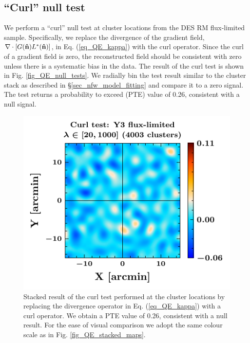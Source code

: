 \subsection{``Curl'' null test}\label{sec_null_tests}

We perform a ``curl'' null test \citep{hu07} at \howmanyclustersinfullsample{} cluster locations from the DES RM \whichyear{} flux-limited sample.
Specifically, we replace the divergence of the gradient field, $\nabla \cdot [G(\bm{\hat{\mbox{n}}}) L^{*}(\bm{\hat{\mbox{n}}})]$, in Eq. (\ref{eq_QE_kappa}) with the curl operator. 
Since the curl of a gradient field is zero, the reconstructed field should be consistent with zero unless there is a systematic bias in the data. 
The result of the curl test is shown in Fig. \ref{fig_QE_null_tests}. 
We radially bin the test result similar to the cluster stack as described in \S\ref{sec_nfw_model_fitting} and compare it to a zero signal.
The test returns a probability to exceed (PTE) value of 0.26, consistent with a null signal.

\begin{figure}
\includegraphics[width=\linewidth]{figs/kappa_model_MF_y3_v6_4_22_full_curl_test_JODY.pdf}
\caption{Stacked result of the curl test performed at the cluster locations by replacing the divergence operator in Eq. (\ref{eq_QE_kappa}) with a curl operator. %
We obtain a PTE value of 0.26, consistent with a null result.
For the ease of visual comparison we adopt the same colour scale as in Fig. \ref{fig_QE_stacked_maps}.
}
\end{figure}
